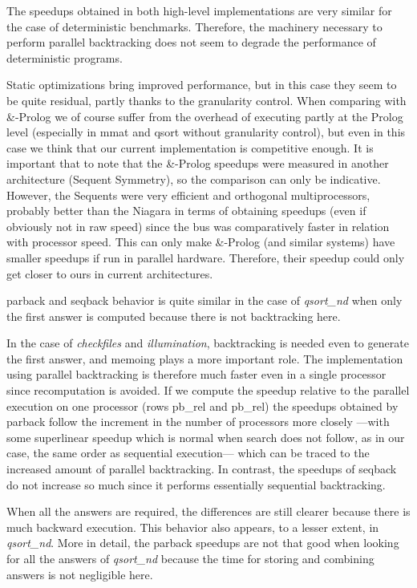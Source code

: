 \documentclass{tlp}
\begin{document}
The speedups obtained in both high-level implementations are very
similar for the case of deterministic benchmarks.  Therefore, the
machinery necessary to perform parallel backtracking does not seem to
degrade the performance of deterministic programs.


Static optimizations bring improved performance, but in this case they
seem to be quite residual, partly thanks to the granularity control.
When comparing with \textsf{\&-Prolog} we of course suffer from the
overhead of executing partly at the Prolog level (especially in
\textsf{mmat} and \textsf{qsort} without granularity control), but
even in this case we think that our current implementation is
competitive enough.  It is important that to note that the
\textsf{\&-Prolog} speedups were measured in another architecture
(Sequent Symmetry), so the comparison can only be indicative.
However, the Sequents were very efficient and orthogonal
multiprocessors, probably better than the Niagara in terms of
obtaining speedups (even if obviously not in raw speed) since the bus
was comparatively faster in relation with processor speed.
This
can only make \textsf{\&-Prolog} (and similar systems) have smaller
speedups if run in parallel hardware.  Therefore, their speedup could
only get closer to ours in current architectures.


\textsf{parback} and \textsf{seqback} behavior is quite similar
in the case of \emph{qsort\_nd} when only the first answer is computed
because there is not backtracking here.




In the case of \emph{checkfiles} and \emph{illumination}, backtracking
is needed even to generate the first answer, and memoing plays a
more important role.
The implementation using parallel backtracking is therefore much
faster even in a single processor since recomputation is avoided.
If we compute the speedup relative to the parallel execution on one
processor (rows \textsf{pb\_rel} and \textsf{pb\_rel})
the speedups obtained by \textsf{parback}
follow the increment in the number of processors more closely ---with
some superlinear speedup which is normal when search does not follow,
as in our case, the same order as sequential execution--- which can be
traced to the increased amount of parallel backtracking.
In contrast, the speedups of \textsf{seqback} do not increase so much
since it performs essentially
sequential backtracking.


When all the answers are required, the differences are still clearer
because there is much backward execution.
This behavior also appears, to a lesser extent, in
\emph{qsort\_nd}. More in detail, the \textsf{parback} speedups are not
that good when looking for all the answers of \emph{qsort\_nd} because
the time for storing and combining answers is not negligible here.
\end{document}
